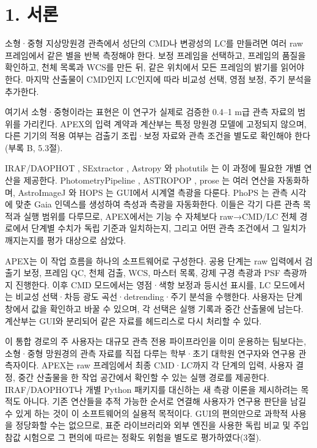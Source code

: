 \section{1. 서론}

소형·중형 지상망원경 관측에서 성단의 CMD나 변광성의 LC를 만들려면 여러 raw 프레임에서 같은 별을 반복 측정해야 한다. 보정 프레임을 선택하고, 프레임의 품질을 확인하고, 천체 목록과 WCS를 만든 뒤, 같은 위치에서 모든 프레임의 밝기를 읽어야 한다. 마지막 산출물이 CMD인지 LC인지에 따라 비교성 선택, 영점 보정, 주기 분석을 추가한다.



여기서 소형·중형이라는 표현은 이 연구가 실제로 검증한 0.4–1 m급 관측 자료의 범위를 가리킨다. APEX의 입력 계약과 계산부는 특정 망원경 모델에 고정되지 않으며, 다른 기기의 적용 여부는 검출기 조립·보정 자료와 관측 조건을 별도로 확인해야 한다(부록 B, 5.3절).



IRAF/DAOPHOT \citep{stetson1987, tody1986, tody1993}, SExtractor \citep{bertin1996}, Astropy \citep{astropy2013, astropy2018, astropy2022}와 photutils \citep{photutils}는 이 과정에 필요한 개별 연산을 제공한다. PhotometryPipeline \citep{mommert2017}, ASTROPOP \citep{campagnolo2019}, prose \citep{garcia2022}는 여러 연산을 자동화하며, AstroImageJ \citep{collins2017}와 HOPS \citep{tsiaras2019}는 GUI에서 시계열 측광을 다룬다. PhoPS \citep{erece2026}는 관측 시각에 맞춘 Gaia 인덱스를 생성하여 측성과 측광을 자동화한다. 이들은 각기 다른 관측 목적과 실행 범위를 다루므로, APEX에서는 기능 수 자체보다 raw→CMD/LC 전체 경로에서 단계별 수치가 독립 기준과 일치하는지, 그리고 어떤 관측 조건에서 그 일치가 깨지는지를 평가 대상으로 삼았다.



APEX는 이 작업 흐름을 하나의 소프트웨어로 구성한다. 공용 단계는 raw 입력에서 검출기 보정, 프레임 QC, 천체 검출, WCS, 마스터 목록, 강제 구경 측광과 PSF 측광까지 진행한다. 이후 CMD 모드에서는 영점·색항 보정과 등시선 표시를, LC 모드에서는 비교성 선택·차등 광도 곡선·detrending·주기 분석을 수행한다. 사용자는 단계 창에서 값을 확인하고 바꿀 수 있으며, 각 선택은 실행 기록과 중간 산출물에 남는다. 계산부는 GUI와 분리되어 같은 자료를 헤드리스로 다시 처리할 수 있다.



이 통합 경로의 주 사용자는 대규모 관측 전용 파이프라인을 이미 운용하는 팀보다는, 소형·중형 망원경의 관측 자료를 직접 다루는 학부·초기 대학원 연구자와 연구용 관측자이다. APEX는 raw 프레임에서 최종 CMD·LC까지 각 단계의 입력, 사용자 결정, 중간 산출물을 한 작업 공간에서 확인할 수 있는 실행 경로를 제공한다. IRAF/DAOPHOT나 개별 Python 패키지를 대신하는 새 측광 이론을 제시하려는 목적도 아니다. 기존 연산들을 추적 가능한 순서로 연결해 사용자가 연구용 판단을 남길 수 있게 하는 것이 이 소프트웨어의 실용적 목적이다. GUI의 편의만으로 과학적 사용을 정당화할 수는 없으므로, 표준 라이브러리와 외부 엔진을 사용한 독립 비교 및 주입 참값 시험으로 그 편의에 따르는 정확도 위험을 별도로 평가하였다(3절).



